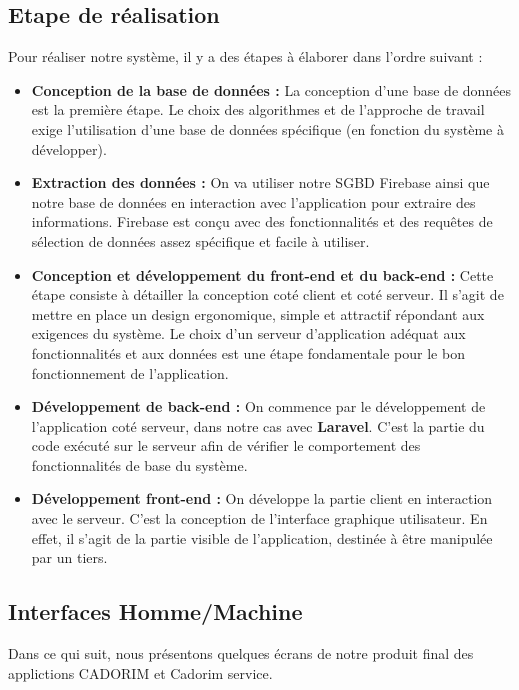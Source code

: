 \subsection{Etape de réalisation}
Pour réaliser notre système, il y a des étapes à élaborer dans l’ordre suivant :
\begin{itemize}[label=$\ast$]
	\item \textbf{Conception de la base de données :} La conception d’une base de données est la
	première étape. Le choix des algorithmes et de l’approche de travail exige l’utilisation
	d’une base de données spécifique (en fonction du système à développer).
	\item \textbf{Extraction des données :}  On va utiliser notre SGBD Firebase ainsi que notre base de
	données en interaction avec l’application pour extraire des informations. Firebase est
	conçu avec des fonctionnalités et des requêtes de sélection de données assez spécifique
	et facile à utiliser.
	\item \textbf{Conception et développement du front-end et du back-end :} 
	Cette étape consiste à
	détailler la conception coté client et coté serveur. Il s’agit de mettre en place un design
	ergonomique, simple et attractif répondant aux exigences du système. Le choix d’un
	serveur d’application adéquat aux fonctionnalités et aux données est une étape
	fondamentale pour le bon fonctionnement de l’application.
	\item \textbf{Développement de back-end :} On commence par le développement de l’application coté
	serveur, dans notre cas avec \textbf{Laravel}. C’est la partie du code exécuté sur le serveur afin
	de vérifier le comportement des fonctionnalités de base du système.
	\item \textbf{Développement front-end :} On développe la partie client en interaction avec le serveur.
	C’est la conception de l'interface graphique utilisateur. En effet, il s'agit de la partie
	visible de l'application, destinée à être manipulée par un tiers.
\end{itemize}
\subsection{Interfaces Homme/Machine}
Dans ce qui suit, nous présentons quelques écrans de notre produit final des applictions CADORIM et Cadorim service.

